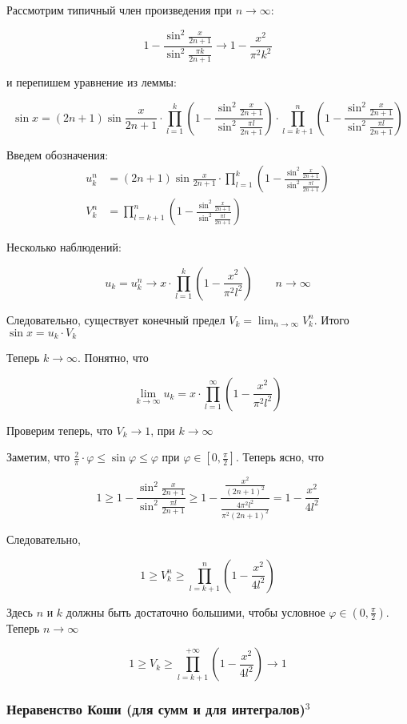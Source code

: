 \documentclass{article}
\begin{document}
Рассмотрим типичный член произведения при $n\to \infty$: 

$$
1 - \frac{\sin^2{\frac{x}{2n+1}}}{\sin^2{\frac{\pi k}{2n+1}}} \to 1 - \frac{x^2}{\pi^2 k^2}
$$

и перепишем уравнение из леммы:

$$
\sin{x} = (2n + 1)\sin{\frac{x}{2n+1}}\cdot \prod_{l=1}^k\left(1 - \frac{\sin^2{\frac{x}{2n+1}}}{\sin^2\frac{\pi l}{2n+1}}\right) \cdot \prod_{l=k+1}^n \left(1 - \frac{\sin^2{\frac{x}{2n+1}}}{\sin^2\frac{\pi l}{2n+1}}\right)
$$

Введем обозначения:
\begin{align*}
    u_k^n &= (2n+1)\sin{\frac{x}{2n+1}}\cdot \prod_{l=1}^k\left(1 - \frac{\sin^2{\frac{x}{2n+1}}}{\sin^2\frac{\pi l}{2n+1}}\right) \\
    V_k^n &= \prod_{l=k+1}^n \left(1 - \frac{\sin^2{\frac{x}{2n+1}}}{\sin^2\frac{\pi l}{2n+1}}\right)
\end{align*}

Несколько наблюдений:

$$
u_k = u_k^n \to x\cdot \prod_{l=1}^k\left(1 - \frac{x^2}{\pi^2 l^2}\right) \qquad n \to \infty
$$

Следовательно, существует конечный предел $V_k = \lim_{n\to \infty} V_k^n$. Итого $\sin{x} = u_k \cdot V_k$

Теперь $k \to \infty$. Понятно, что 

$$
\lim_{k\to \infty} u_k = x \cdot \prod_{l=1}^\infty\left(1 - \frac{x^2}{\pi^2 l^2}\right)
$$

Проверим теперь, что $V_k \to 1$, при $k\to \infty$

Заметим, что $\frac{2}{\pi} \cdot \varphi \leq \sin{\varphi} \leq \varphi$ при $\varphi \in \left[0, \frac{\pi}{2}\right]$. Теперь ясно, что 

$$
1 \geq 1 - \frac{\sin^2{\frac{x}{2n+1}}}{\sin^2{\frac{\pi l}{2n+1}}} \geq 1 - \frac{\frac{x^2}{(2n+1)^2}}{\frac{4\pi^2 l^2}{\pi^2(2n+1)^2}} = 1 - \frac{x^2}{4l^2} 
$$

Следовательно, 

$$
1 \geq V_k^n \geq \prod_{l =k+1}^n \left(1 - \frac{x^2}{4l^2}\right)
$$

Здесь $n$ и $k$ должны быть достаточно большими, чтобы условное $\varphi \in \left(0, \frac{\pi}{2}\right)$. Теперь $n\to \infty$

$$
1 \geq V_k \geq \prod_{l=k+1}^{+\infty}\left(1 - \frac{x^2}{4l^2}\right) \to 1
$$

\subsubsection{Неравенство Коши (для сумм и для интегралов)\texorpdfstring{$^3$}{}}
\end{document}

